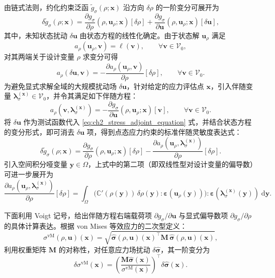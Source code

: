 由链式法则，约化约束泛函 $\tilde{g}_\sigma(\rho;\boldsymbol{x})$ 沿方向 $\delta\rho$ 的一阶变分可展开为
\[
\delta \tilde g_\sigma(\rho;\boldsymbol{x}) = \frac{\partial g_\sigma}{\partial \rho}(\rho,\boldsymbol{u}_\rho;\boldsymbol{x})[\delta\rho] + \frac{\partial g_\sigma}{\partial \boldsymbol{u}}(\rho,\boldsymbol{u}_\rho;\boldsymbol{x})[\delta\boldsymbol{u}],
\]
其中，未知状态扰动 $\delta\boldsymbol{u}$ 由状态方程的线性化确定。由于状态解 $\boldsymbol{u}_\rho$ 满足
\[
a_\rho(\boldsymbol{u}_\rho,\boldsymbol{v})=\ell(\boldsymbol{v}),\qquad \forall \boldsymbol{v}\in \mathcal{V}_0,
\]
对其两端关于设计变量 $\rho$ 求变分可得
\[
a_\rho(\delta\boldsymbol{u},\boldsymbol{v}) = -\frac{\partial a_\rho(\boldsymbol{u}_\rho,\boldsymbol{v})}{\partial \rho}[\delta\rho], \qquad \forall \boldsymbol{v}\in \mathcal{V}_0.
\]
为避免显式求解全域的大规模扰动场 $\delta\boldsymbol{u}$，针对给定的应力评估点 $\boldsymbol{x}$，引入伴随变量 $\boldsymbol{\lambda}_\sigma^{(\boldsymbol{x})}\in \mathcal{V}_0$，并令其满足如下伴随方程：
\begin{equation} 
	a_\rho(\boldsymbol{v},\boldsymbol{\lambda}_\sigma^{(\boldsymbol{x})}) = -\frac{\partial g_\sigma}{\partial \boldsymbol{u}}(\rho,\boldsymbol{u}_\rho;\boldsymbol{x})[\boldsymbol{v}], \qquad \forall \boldsymbol{v}\in \mathcal{V}_0.
	\label{eq:ch2_stress_adjoint_equation}
\end{equation}
将 $\delta\boldsymbol{u}$ 作为测试函数代入 \eqref{eq:ch2_stress_adjoint_equation} 式，并结合状态方程的变分形式，即可消去 $\delta\boldsymbol{u}$ 项，得到点态应力约束的标准伴随灵敏度表达式：
\begin{equation} \label{eq:ch2_stress_sensitivity_standard}
	\delta \tilde{g}_\sigma(\rho;\boldsymbol{x}) = \frac{\partial g_\sigma}{\partial \rho}(\rho,\boldsymbol{u}_\rho;\boldsymbol{x})[\delta\rho] - \frac{\partial a_\rho(\boldsymbol{u}_\rho,\boldsymbol{\lambda}_\sigma^{(\boldsymbol{x})})}{\partial \rho}[\delta\rho].
\end{equation}
引入空间积分哑变量 $\boldsymbol{y} \in \Omega$，上式中的第二项（即双线性型对设计变量的偏导数）可进一步展开为
\[
\frac{\partial a_\rho(\boldsymbol{u}_\rho,\boldsymbol{\lambda}_\sigma^{(\boldsymbol{x})})}{\partial \rho}[\delta\rho] = \int_{\Omega} \big(\mathbb{C}'(\rho(\boldsymbol{y}))\,\delta\rho(\boldsymbol{y}) : \boldsymbol{\varepsilon}(\boldsymbol{u}_\rho(\boldsymbol{y}))\big) : \boldsymbol{\varepsilon}(\boldsymbol{\lambda}_\sigma^{(\boldsymbol{x})}(\boldsymbol{y}))\; \mathrm{d}\boldsymbol{y}.
\]

下面利用 Voigt 记号，给出伴随方程右端载荷项 $\partial g_\sigma / \partial \boldsymbol{u}$ 与显式偏导数项 $\partial g_\sigma / \partial \rho$ 的具体计算表达。根据 von Mises 等效应力的二次型定义：
\[
\sigma^{\mathrm{vM}}(\rho,\boldsymbol{u})(\boldsymbol{x}) = \sqrt{ \hat{\boldsymbol{\sigma}}(\rho,\boldsymbol{u})(\boldsymbol{x})^{\top}\boldsymbol{M}\, \hat{\boldsymbol{\sigma}}(\rho,\boldsymbol{u})(\boldsymbol{x}) },
\]
利用权重矩阵 $\boldsymbol{M}$ 的对称性，对任意应力场扰动 $\delta\hat{\boldsymbol{\sigma}}$，其一阶变分为
\[
\delta\sigma^{\mathrm{vM}}(\boldsymbol{x}) = \left(\frac{\boldsymbol{M}\hat{\boldsymbol{\sigma}}(\boldsymbol{x})}{\sigma^{\mathrm{vM}}(\boldsymbol{x})}\right)^{\!\top}\delta\hat{\boldsymbol{\sigma}}(\boldsymbol{x}).
\]

